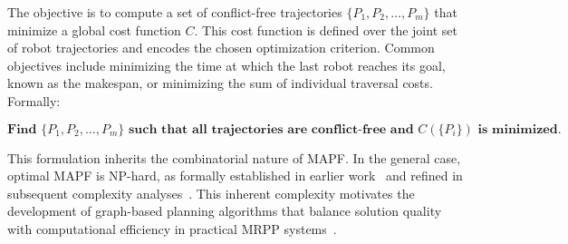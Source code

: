 The objective is to compute a set of conflict-free trajectories
\(\{P_1, P_2, \dots, P_m\}\) that minimize a global cost function \(C\). This cost function is
defined over the joint set of robot trajectories and encodes the chosen optimization criterion.
Common objectives include minimizing the time at which the last robot reaches its goal, known as
the makespan, or minimizing the sum of individual traversal costs. Formally:

\begin{tcolorbox}[colback=gray!5!white, colframe=gray!30, boxrule=0.3pt, arc=3pt, left=3pt, right=3pt, top=1pt, bottom=1pt]
\vspace{-3pt}
\[
\textbf{Find } \{P_1, P_2, \dots, P_m\} \textbf{ such that all trajectories are conflict-free and } C(\{P_i\}) \textbf{ is minimized.}
\]
\vspace{-6pt}
\end{tcolorbox}

This formulation inherits the combinatorial nature of MAPF. In the general case, optimal MAPF is
NP-hard, as formally established in earlier work~\cite{surynek2010} and refined in subsequent complexity analyses~\cite{geft2022refined}. This inherent complexity motivates the
development of graph-based planning algorithms that balance solution quality with computational
efficiency in practical MRPP systems~\cite{gao2024review}.